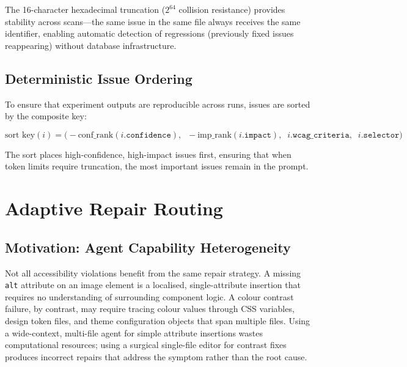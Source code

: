 The 16-character hexadecimal truncation ($2^{64}$ collision resistance)
provides stability across scans—the same issue in the same file always
receives the same identifier, enabling automatic detection of regressions
(previously fixed issues reappearing) without database infrastructure.

\subsection{Deterministic Issue Ordering}

To ensure that experiment outputs are reproducible across runs, issues are
sorted by the composite key:

\begin{equation}
  \text{sort key}(i) = \bigl(
    -\text{conf\_rank}(i.\texttt{confidence}),\;\;
    -\text{imp\_rank}(i.\texttt{impact}),\;\;
    i.\texttt{wcag\_criteria},\;\;
    i.\texttt{selector}
  \bigr)
  \label{eq:sort_key}
\end{equation}

\noindent
The sort places high-confidence, high-impact issues first, ensuring that when
token limits require truncation, the most important issues remain in the prompt.

\section{Adaptive Repair Routing}
\label{sec:router}

\subsection{Motivation: Agent Capability Heterogeneity}

Not all accessibility violations benefit from the same repair strategy.
A missing \texttt{alt} attribute on an image element is a localised,
single-attribute insertion that requires no understanding of surrounding
component logic.  A colour contrast failure, by contrast, may require
tracing colour values through CSS variables, design token files, and theme
configuration objects that span multiple files.  Using a wide-context,
multi-file agent for simple attribute insertions wastes computational
resources; using a surgical single-file editor for contrast fixes
produces incorrect repairs that address the symptom rather than the root cause.

